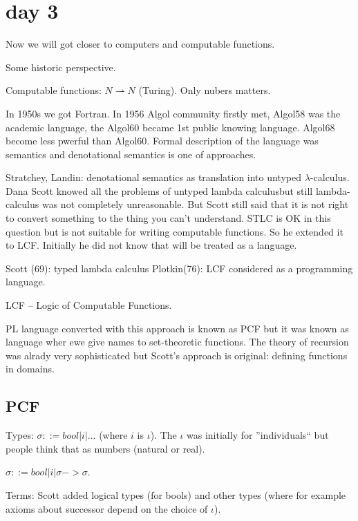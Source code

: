 \documentclass[a4paper,10pt]{book}
\begin{document}
\section{day 3}

Now we will got closer to computers and computable functions.

Some historic perspective.

Computable functions: $N \rightharpoonup N$ (Turing). Only nubers matters.

In 1950s we got Fortran. In 1956 Algol community firstly met, Algol58 was the academic language,
the Algol60 became 1st public knowing language. Algol68 become less pwerful than Algol60.
Formal description of the language was semantics and denotational semantics is one of approaches.

Stratchey, Landin: denotational semantics  as translation into untyped $\lambda$-calculus.
Dana Scott knowed all the problems of untyped lambda calculusbut still lambda-calculus was not 
completely unreasonable. But Scott still said that it is not right to convert something to the 
thing you can't understand. STLC is OK in this question but is not suitable for writing computable 
functions. So he extended it to LCF. Initially he did not know that will be treated as a language.

Scott (69): typed lambda calculus
Plotkin(76): LCF considered as a programming language.

LCF -- Logic of Computable Functions.

PL language converted with this approach is known as PCF but it was known as language wher ewe give 
names to set-theoretic functions. The theory of recursion was alrady very sophisticated but
Scott's approach is original: defining functions in domains.


\subsection{PCF}

Types: $\sigma ::= bool | i  | ...$ (where $i$ is $\iota$). The $\iota$ was initially for ''individuals``
but people think that as numbers (natural or real).

$\sigma ::= bool | i | \sigma -> \sigma$.

Terms: Scott added logical types (for bools) and other types (where for example axioms about successor
depend on the choice of $\iota$).
\end{document}
